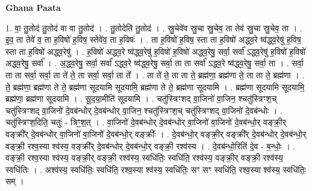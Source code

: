 \documentclass[17pt]{extarticle}
\begin{document}
\textbf{Ghana Paata } \newline

1. वा॒ तु॒तोद॑ तु॒तोद॑ वा वा तु॒तोद॑ । . तु॒तोदेति॑ तु॒तोद॑ । . स्रु॒चेवे॑व स्रु॒चा स्रु॒चेव॒ ता तेव॑ स्रु॒चा स्रु॒चेव॒ ता । . इ॒व॒ ता तेवे॑ व॒ ता ह॒विषो॑ ह॒विष॒ स्तेवे॑व॒ ता ह॒विषः॑ । . ता ह॒विषो॑ ह॒विष॒ स्ता ता ह॒विषो॑ अद्ध्व॒रे ष्व॑द्ध्व॒रेषु॑ ह॒विष॒ स्ता ता ह॒विषो॑ अद्ध्व॒रेषु॑ । . ह॒विषो॑ अद्ध्व॒रे ष्व॑द्ध्व॒रेषु॑ ह॒विषो॑ ह॒विषो॑ अद्ध्व॒रेषु॒ सर्वा॒ सर्वा᳚ ऽद्ध्व॒रेषु॑ ह॒विषो॑ ह॒विषो॑ अद्ध्व॒रेषु॒ सर्वा᳚ । . अ॒द्ध्व॒रेषु॒ सर्वा॒ सर्वा᳚ ऽद्ध्व॒रे ष्व॑द्ध्व॒रेषु॒ सर्वा॒ ता ता सर्वा᳚ ऽद्ध्व॒रे ष्व॑द्ध्व॒रेषु॒ सर्वा॒ ता । . सर्वा॒ ता ता सर्वा॒ सर्वा॒ ता ते॑ ते॒ ता सर्वा॒ सर्वा॒ ता ते᳚ । . ता ते॑ ते॒ ता ता ते॒ ब्रह्म॑णा॒ ब्रह्म॑णा ते॒ ता ता ते॒ ब्रह्म॑णा । . ते॒ ब्रह्म॑णा॒ ब्रह्म॑णा ते ते॒ ब्रह्म॑णा सूदयामि सूदयामि॒ ब्रह्म॑णा ते ते॒ ब्रह्म॑णा सूदयामि । . ब्रह्म॑णा सूदयामि सूदयामि॒ ब्रह्म॑णा॒ ब्रह्म॑णा सूदयामि । . सू॒द॒या॒मीति॑ सूदयामि । . चतु॑स्त्रिꣳशद् वा॒जिनो॑ वा॒जिन॒ श्चतु॑स्त्रिꣳश॒च् चतु॑स्त्रिꣳशद् वा॒जिनो॑ दे॒वब॑न्धोर् दे॒वब॑न्धोर् वा॒जिन॒ श्चतु॑स्त्रिꣳश॒च् चतु॑स्त्रिꣳशद् वा॒जिनो॑ दे॒वब॑न्धोः । . चतु॑स्त्रिꣳश॒दिति॒ चतुः॑ - त्रिꣳ॒॒श॒त् । . वा॒जिनो॑ दे॒वब॑न्धोर् दे॒वब॑न्धोर् वा॒जिनो॑ वा॒जिनो॑ दे॒वब॑न्धो॒र् वङ्क्री॒र् वङ्क्री᳚र् दे॒वब॑न्धोर् वा॒जिनो॑ वा॒जिनो॑ दे॒वब॑न्धो॒र् वङ्क्रीः᳚ । . दे॒वब॑न्धो॒र् वङ्क्री॒र् वङ्क्री᳚र् दे॒वब॑न्धोर् दे॒वब॑न्धो॒र् वङ्क्री॒ रश्व॒स्या श्व॑स्य॒ वङ्क्री᳚र् दे॒वब॑न्धोर् दे॒वब॑न्धो॒र् वङ्क्री॒ रश्व॑स्य । . दे॒वब॑न्धो॒रिति॑ दे॒व - ब॒न्धोः॒ । . वङ्क्री॒ रश्व॒स्या श्व॑स्य॒ वङ्क्री॒र् वङ्क्री॒ रश्व॑स्य॒ स्वधि॑तिः॒ स्वधि॑ति॒ रश्व॑स्य॒ वङ्क्री॒र् वङ्क्री॒ रश्व॑स्य॒ स्वधि॑तिः । . अश्व॑स्य॒ स्वधि॑तिः॒ स्वधि॑ति॒ रश्व॒स्या श्व॑स्य॒ स्वधि॑तिः॒ सꣳ सꣳ स्वधि॑ति॒ रश्व॒स्या श्व॑स्य॒ स्वधि॑तिः॒ सम् । \newline
\end{document}
